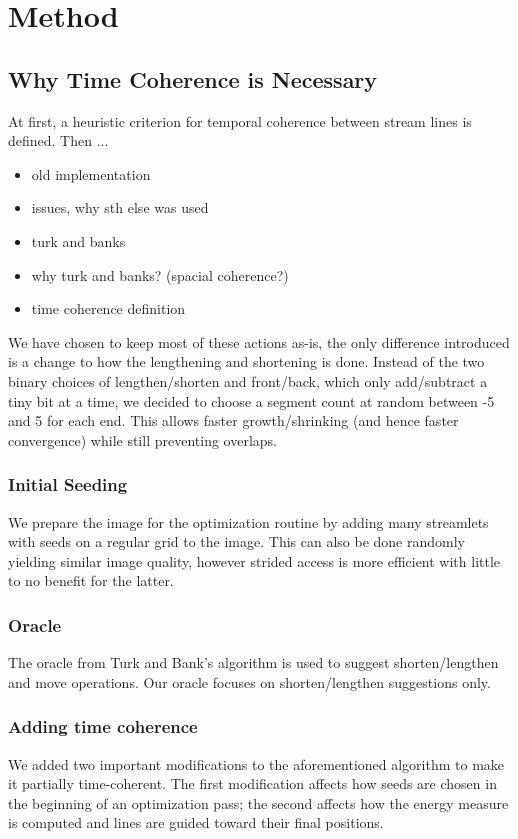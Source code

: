 \chapter{Method}




\section{Why Time Coherence is Necessary}







At first, a heuristic criterion for temporal coherence between stream lines is defined.
Then ...


\begin{itemize}
    \item old implementation
    \item issues, why sth else was used
    \item turk and banks
    \item why turk and banks? (spacial coherence?)
    \item time coherence definition
\end{itemize}

We have chosen to keep most of these actions as-is, the only difference introduced is
a change to how the lengthening and shortening is done. 
Instead of the two binary choices of lengthen/shorten and front/back, which only add/subtract a tiny bit at a time,
we decided to choose a segment count at random between -5 and 5 for each end.
This allows faster growth/shrinking (and hence faster convergence) while still preventing overlaps.

\subsection{Initial Seeding}
We prepare the image for the optimization routine by adding many streamlets with seeds on a regular grid to the image.
This can also be done randomly yielding similar image quality,
however strided access is more efficient with little to no benefit for the latter.

\subsection{Oracle}
The oracle from Turk and Bank's algorithm is used to suggest shorten/lengthen and move operations.
Our oracle focuses on shorten/lengthen suggestions only.

\subsection{Adding time coherence}
We added two important modifications to the aforementioned algorithm to make it partially time-coherent.
The first modification affects how seeds are chosen in the beginning of an optimization pass; the second affects
how the energy measure is computed and lines are guided toward their final positions.
